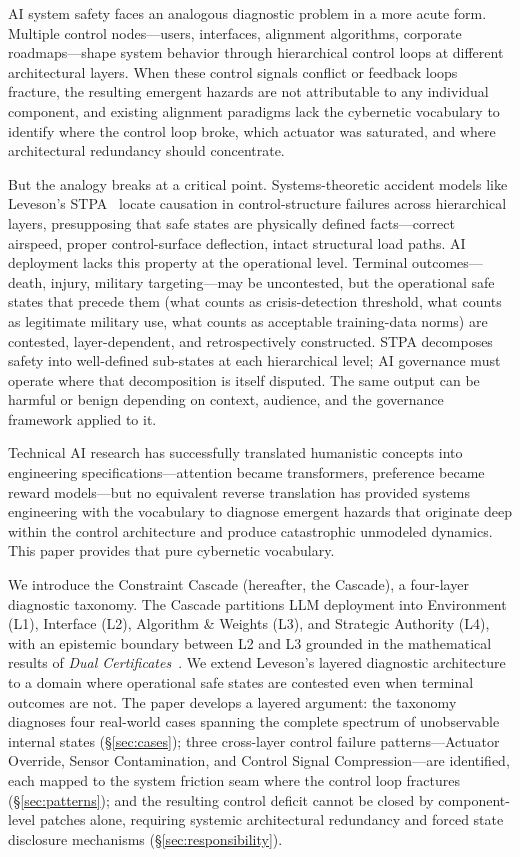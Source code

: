 \documentclass[11pt]{article}
\begin{document}
AI system safety faces an analogous diagnostic problem in a more acute form. Multiple control nodes---users, interfaces, alignment algorithms, corporate roadmaps---shape system behavior through hierarchical control loops at different architectural layers. When these control signals conflict or feedback loops fracture, the resulting emergent hazards are not attributable to any individual component, and existing alignment paradigms lack the cybernetic vocabulary to identify where the control loop broke, which actuator was saturated, and where architectural redundancy should concentrate.

But the analogy breaks at a critical point. Systems-theoretic accident models like Leveson's STPA~\cite{leveson2012engineering, leveson2018stpa} locate causation in control-structure failures across hierarchical layers, presupposing that safe states are physically defined facts---correct airspeed, proper control-surface deflection, intact structural load paths. AI deployment lacks this property at the operational level. Terminal outcomes---death, injury, military targeting---may be uncontested, but the operational safe states that precede them (what counts as crisis-detection threshold, what counts as legitimate military use, what counts as acceptable training-data norms) are contested, layer-dependent, and retrospectively constructed. STPA decomposes safety into well-defined sub-states at each hierarchical level; AI governance must operate where that decomposition is itself disputed. The same output can be harmful or benign depending on context, audience, and the governance framework applied to it.

Technical AI research has successfully translated humanistic concepts into engineering specifications---attention became transformers, preference became reward models---but no equivalent reverse translation has provided systems engineering with the vocabulary to diagnose emergent hazards that originate deep within the control architecture and produce catastrophic unmodeled dynamics. This paper provides that pure cybernetic vocabulary.

We introduce the Constraint Cascade (hereafter, the Cascade), a four-layer diagnostic taxonomy. The Cascade partitions LLM deployment into Environment (L1), Interface (L2), Algorithm \& Weights (L3), and Strategic Authority (L4), with an epistemic boundary between L2 and L3 grounded in the mathematical results of \textit{Dual Certificates}~\cite{anon2026dual}. We extend Leveson's layered diagnostic architecture to a domain where operational safe states are contested even when terminal outcomes are not. The paper develops a layered argument: the taxonomy diagnoses four real-world cases spanning the complete spectrum of unobservable internal states (\S\ref{sec:cases}); three cross-layer control failure patterns---Actuator Override, Sensor Contamination, and Control Signal Compression---are identified, each mapped to the system friction seam where the control loop fractures (\S\ref{sec:patterns}); and the resulting control deficit cannot be closed by component-level patches alone, requiring systemic architectural redundancy and forced state disclosure mechanisms (\S\ref{sec:responsibility}).
\end{document}

